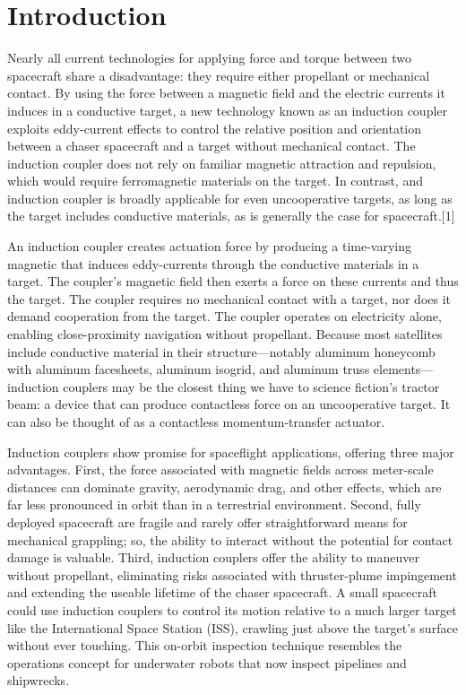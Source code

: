 \section{Introduction} 

Nearly all current technologies for applying force and torque between two spacecraft share a disadvantage: they require either propellant or mechanical contact. By using the force between a magnetic field and the electric currents it induces in a conductive target, a new technology known as an induction coupler exploits eddy-current effects to control the relative position and orientation between a chaser spacecraft and a target without mechanical contact. The induction coupler does not rely on familiar magnetic attraction and repulsion, which would require ferromagnetic materials on the target.  In contrast, and induction coupler is broadly applicable for even uncooperative targets, as long as the target includes conductive materials, as is generally the case for spacecraft.[1]

An induction coupler creates actuation force by producing a time-varying magnetic that induces eddy-currents  through the conductive materials in a target. The coupler’s magnetic field then exerts a force on these currents and thus the target. The coupler requires no mechanical contact with a target, nor does it demand cooperation from the target. The coupler operates on electricity alone, enabling close-proximity navigation without propellant. Because most satellites include conductive material in their structure—notably aluminum honeycomb with aluminum facesheets, aluminum isogrid, and aluminum truss elements—induction couplers may be the closest thing we have to science fiction's tractor beam: a device that can produce contactless force on an uncooperative target. It can also be thought of as a contactless momentum-transfer actuator.

Induction couplers show promise for spaceflight applications, offering three major advantages. First, the force associated with magnetic fields across meter-scale distances can dominate gravity, aerodynamic drag, and other effects, which are far less pronounced in orbit than in a terrestrial environment. Second, fully deployed spacecraft are fragile and rarely offer straightforward means for mechanical grappling; so, the ability to interact without the potential for contact damage is valuable. Third, induction couplers offer the ability to maneuver without propellant, eliminating risks associated with thruster-plume impingement \cite{BaerwaldR.S.1977}
and extending the useable lifetime of the chaser spacecraft.
A small spacecraft could use induction couplers to control its motion relative to a much larger target like the International Space Station (ISS), crawling just above the target’s surface without ever touching. This on-orbit inspection technique resembles the operations concept for underwater robots that now inspect pipelines and shipwrecks. \cite{Whitcomb2000}

